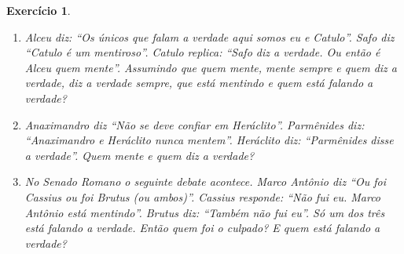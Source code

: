 \documentclass[a4paper,10pt]{article}
\newtheorem{exrcc}{Exercício}[subsection] %
\begin{document}
\begin{exrcc}
\begin{enumerate}
que o aprendizado é mais importante que a nota, mas ontem passou o dia todo fazendo um
exercício para nota extra que ela já sabia fazer e que não ia acrescentar em nada ao
que ela já sabia!''. A pessoa tem razão no seu juízo sobre Fulana?
\item Alceu diz: ``Os únicos que falam a verdade aqui somos eu e Catulo''. Safo diz
``Catulo é um mentiroso''. Catulo replica: ``Safo diz a verdade. Ou então é Alceu quem
mente''. Assumindo que quem mente, mente sempre e quem diz a verdade, diz a verdade
sempre, que está mentindo e quem está falando a verdade?
\item Anaximandro diz ``Não se deve confiar em Heráclito''. Parmênides diz:
``Anaximandro e Heráclito nunca mentem''. Heráclito diz: ``Parmênides disse a
verdade''. Quem mente e quem diz a verdade?
\item No Senado Romano o seguinte debate acontece. Marco Antônio diz ``Ou foi Cassius ou
foi Brutus (ou ambos)''. Cassius responde: ``Não fui eu. Marco Antônio está mentindo''.
Brutus diz: ``Também não fui eu''. Só um dos três está falando a verdade. Então quem
foi o culpado? E quem está falando a verdade?
\end{enumerate}

\end{exrcc}
\end{document}
